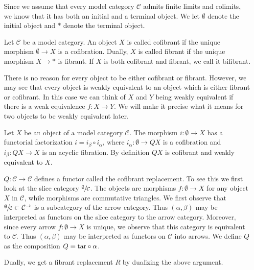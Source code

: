 \documentclass[../thesis.tex]{subfiles}
\begin{document}
            Since we assume that every model category $\mathcal{C}$ admits finite limits and colimits, we know that it has both an initial and a terminal object. We let $\emptyset$ denote the initial object and $*$ denote the terminal object. 

            \begin{definition}
                Let $\mathcal{C}$ be a model category. An object $X$ is called cofibrant if the unique morphism $\emptyset \rightarrow X$ is a cofibration. Dually, $X$ is called fibrant if the unique morphism $X \rightarrow *$ is fibrant. If $X$ is both cofibrant and fibrant, we call it bifibrant.
            \end{definition}

            There is no reason for every object to be either cofibrant or fibrant. However, we may see that every object is weakly equivalent to an object which is either fibrant or cofibrant. In this case we can think of $X$ and $Y$ being weakly equivalent if there is a weak equivalence $f : X \rightarrow Y$. We will make it precise what it means for two objects to be weakly equivalent later.

            \begin{construction}
                Let $X$ be an object of a model category $\mathcal{C}$. The morphism $i:\emptyset\rightarrow X$ has a functorial factorization $i=i_\beta\circ i_\alpha$, where $i_\alpha: \emptyset\rightarrow QX$ is a cofibration and $i_\beta: QX\rightarrow X$ is an acyclic fibration. By definition $QX$ is cofibrant and weakly equivalent to $X$.

                $Q: \mathcal{C}\rightarrow \mathcal{C}$ defines a functor called the cofibrant replacement. To see this we first look at the slice category $\sfrac{\emptyset}{\mathcal{C}}$. The objects are morphisms $f:\emptyset \rightarrow X$ for any object $X$ in $\mathcal{C}$, while morphisms are commutative triangles. We first observe that $\sfrac{\emptyset}{\mathcal{C}}\subset\mathcal{C}^\rightarrow$ is a subcategory of the arrow category. Thus $(\alpha, \beta)$ may be interpreted as functors on the slice category to the arrow category. Moreover, since every arrow $f:\emptyset \rightarrow X$ is unique, we observe that this category is equivalent to $\mathcal{C}$. Thus $(\alpha, \beta)$ may be interpreted as functors on $\mathcal{C}$ into arrows. We define $Q$ as the composition $Q = \tt{tar} \circ \alpha$. 

                Dually, we get a fibrant replacement $R$ by dualizing the above argument.
            \end{construction}
\end{document}
